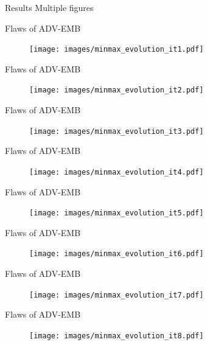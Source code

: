 \documentclass[10pt]{beamer}
\begin{document}
\begin{frame}{Results}
Multiple figures
\end{frame}


\begin{frame}{Flaws of ADV-EMB}
    \begin{figure}
        \texttt{[image: images/minmax\_evolution\_it1.pdf]}
    \end{figure}
\end{frame}


\begin{frame}{Flaws of ADV-EMB}
    \begin{figure}
        \texttt{[image: images/minmax\_evolution\_it2.pdf]}
    \end{figure}
\end{frame}


\begin{frame}{Flaws of ADV-EMB}
    \begin{figure}
        \texttt{[image: images/minmax\_evolution\_it3.pdf]}
    \end{figure}
\end{frame}

\begin{frame}{Flaws of ADV-EMB}
    \begin{figure}
        \texttt{[image: images/minmax\_evolution\_it4.pdf]}
    \end{figure}
\end{frame}

\begin{frame}{Flaws of ADV-EMB}
    \begin{figure}
        \texttt{[image: images/minmax\_evolution\_it5.pdf]}
    \end{figure}
\end{frame}

\begin{frame}{Flaws of ADV-EMB}
    \begin{figure}
        \texttt{[image: images/minmax\_evolution\_it6.pdf]}
    \end{figure}
\end{frame}

\begin{frame}{Flaws of ADV-EMB}
    \begin{figure}
        \texttt{[image: images/minmax\_evolution\_it7.pdf]}
    \end{figure}
\end{frame}

\begin{frame}{Flaws of ADV-EMB}
    \begin{figure}
        \texttt{[image: images/minmax\_evolution\_it8.pdf]}
    \end{figure}
\end{frame}
\end{document}

